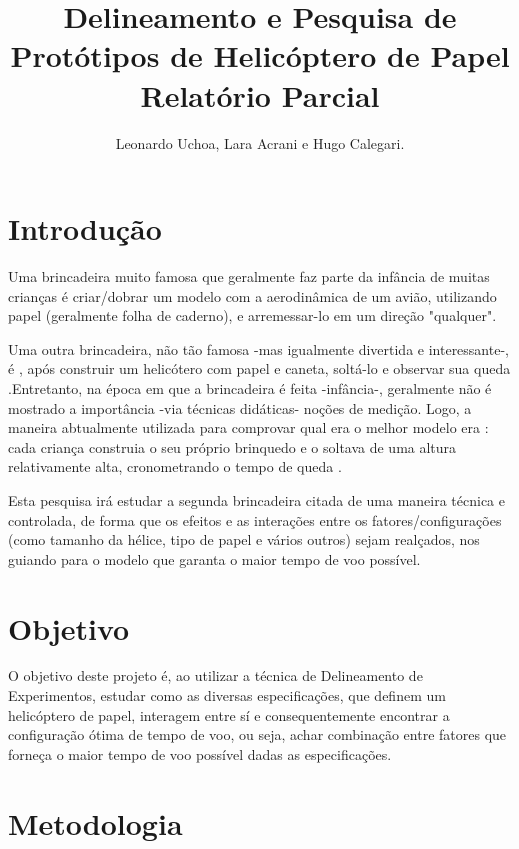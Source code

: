 \documentclass[10pt]{article}
\begin{document}
\title{Delineamento e Pesquisa de Protótipos de Helicóptero de Papel
                  Relatório Parcial}
\author{Leonardo Uchoa, Lara Acrani e Hugo Calegari.}

\date{ }
\maketitle

\cleardoublepage

\tableofcontents

\section{Introdução}

Uma brincadeira muito famosa que geralmente faz parte da infância de muitas crianças é criar/dobrar um modelo com a aerodinâmica de um avião, utilizando papel (geralmente folha de caderno), e arremessar-lo em um direção "qualquer".

Uma outra brincadeira, não tão famosa -mas igualmente divertida e interessante-, é , após construir um helicótero com papel e caneta,  soltá-lo e observar sua queda .Entretanto, na época em que a brincadeira é feita -infância-, geralmente não é mostrado a importância -via técnicas didáticas- noções de medição. Logo, a maneira abtualmente utilizada para comprovar qual era o melhor modelo era : cada criança construia o seu próprio brinquedo e o soltava de uma altura relativamente alta, cronometrando o tempo de queda .

Esta pesquisa  irá estudar a segunda brincadeira citada de uma maneira técnica e controlada, de forma que os efeitos e as interações entre os fatores/configurações (como tamanho da hélice, tipo de papel e vários outros) sejam realçados, nos guiando para o modelo que garanta o maior tempo de voo possível.

\section{Objetivo}
O objetivo deste projeto é, ao utilizar a técnica de Delineamento de Experimentos, estudar como as diversas especificações, que definem um helicóptero de papel, interagem entre sí e consequentemente encontrar a configuração  ótima de tempo de voo, ou seja, achar combinação entre fatores que forneça o maior tempo de voo possível dadas as especificações.

\section{Metodologia}
\end{document}
